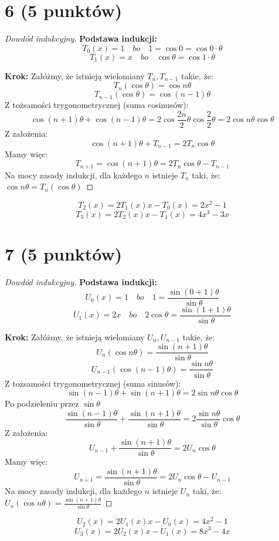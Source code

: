 \documentclass{article}
\title{}
\date{20.04.2020}
\author{Maurycy Borkowski}
\begin{document}
\maketitle

\section{6 (5 punktów)}
\begin{proof}[Dowdód indukcyjny]
\textbf{\newline Podstawa indukcji:}
\newline
$$
T_0(x) = 1 \quad bo \quad
1 = \cos 0 = \cos {0\cdot\theta}
$$
$$
T_1(x) = x \quad bo \quad \cos \theta = \cos {1\cdot\theta} 
$$

\textbf{\newline Krok:}
\newline
Załóżmy, że istnieją wielomiany $T_n, T_{n-1}$ takie, że:
$$
T_n(\cos \theta) = \cos{n \theta}
$$
$$
T_{n-1}(\cos \theta) = \cos{(n-1) \theta} 
$$
Z tożsamości trygonometrycznej (suma cosinusów):
$$
\cos {(n+1) \theta} + \cos {(n-1) \theta} = 2 \cos {\frac{2n}{2}\theta} \cos{\frac{2}{2}\theta} = 2 \cos{n \theta} \cos {\theta} 
$$
Z założenia:
$$
\cos {(n+1) \theta} + T_{n-1} = 2T_n \cos \theta
$$
Mamy więc:
$$
T_{n+1} = \cos{(n+1)\theta} = 2T_n \cos \theta - T_{n-1}
$$
Na mocy zasady indukcji, dla każdego $n$ istnieje $T_n$ taki, że: $\cos{n \theta} = T_n(\cos \theta)$
\end{proof}
$$
T_2(x) = 2T_1(x) x - T_0(x) = 2x^2 - 1
$$
$$
T_3(x) = 2T_2(x) x - T_1(x) = 4x^3 - 3x
$$
\section{7 (5 punktów)}
\begin{proof}[Dowdód indukcyjny]
\textbf{\newline Podstawa indukcji:}
\newline
$$
U_0(x) = 1 \quad bo \quad
1 = \frac{\sin (0 + 1)\theta}{\sin{\theta}}
$$
$$
U_1(x) = 2x \quad bo \quad 2\cos\theta = \frac{\sin (1 + 1)\theta}{\sin{\theta}}
$$

\textbf{\newline Krok:}
\newline
Załóżmy, że istnieją wielomiany $U_n, U_{n-1}$ takie, że:
$$
U_n(\cos n\theta) = \frac{\sin (n + 1)\theta}{\sin{\theta}}
$$
$$
U_{n-1}(\cos (n-1)\theta) = \frac{\sin n \theta}{\sin{\theta}}
$$
Z tożsamości trygonometrycznej (suma sinusów):
$$
\sin{(n-1)\theta} + \sin{(n+1)\theta} = 2 \sin n\theta \cos \theta
$$
Po podzieleniu przez $\sin \theta$
$$
\frac{\sin{(n-1)\theta}}{\sin \theta} + \frac{\sin{(n+1)\theta}}{\sin \theta} = 2 \frac{\sin n\theta}
{\sin \theta} \cos \theta
$$
Z założenia:
$$
U_{n-1} + \frac{\sin{(n+1)\theta}}{\sin \theta}  = 2U_n \cos \theta
$$
Mamy więc:
$$
U_{n+1} = \frac{\sin{(n+1)\theta}}{\sin \theta} = 2U_n \cos \theta - U_{n-1}
$$
Na mocy zasady indukcji, dla każdego $n$ istnieje $U_n$ taki, że: \\$U_n(\cos n\theta) = \frac{\sin (n + 1)\theta}{\sin{\theta}}$
\end{proof}
$$
U_2(x) = 2U_1(x) x - U_0(x) = 4x^2 - 1
$$
$$
U_3(x) = 2U_2(x) x - U_1(x) = 8x^3 - 4x
$$
\end{document}
